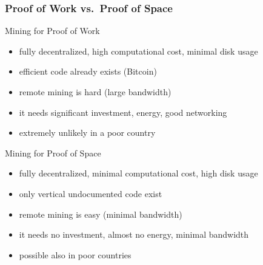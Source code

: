 \documentclass[11pt]{beamer}  %
\begin{document}
\begin{frame}\frametitle{Proof of Work vs.\ Proof of Space}

  \begin{greenbox}{Mining for Proof of Work}
    \begin{itemize}
    \item fully decentralized, high computational cost, minimal disk usage
    \item efficient code already exists (Bitcoin)
    \item remote mining is hard (large bandwidth)
    \item it needs significant investment, energy, good networking
    \item extremely unlikely in a poor country
    \end{itemize}
  \end{greenbox}

  \pause
  \medskip

  \begin{greenbox}{Mining for Proof of Space}
    \begin{itemize}
    \item fully decentralized, minimal computational cost, high disk usage
    \item only vertical undocumented code exist
    \item remote mining is easy (minimal bandwidth)
    \item it needs no investment, almost no energy, minimal bandwidth
    \item possible also in poor countries
    \end{itemize}
  \end{greenbox}
\end{frame}
\end{document}
